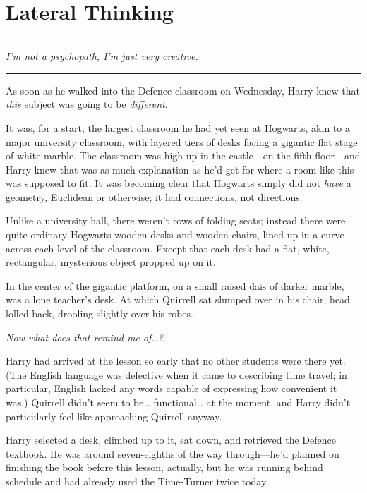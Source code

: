 \chapter{Lateral Thinking}

\begin{center}\rule{3in}{0.4pt}\end{center}

\emph{I'm not a psychopath, I'm just very creative.}

\begin{center}\rule{3in}{0.4pt}\end{center}

As soon as he walked into the Defence classroom on Wednesday, Harry knew
that \emph{this} subject was going to be \emph{different}.

It was, for a start, the largest classroom he had yet seen at Hogwarts,
akin to a major university classroom, with layered tiers of desks facing
a gigantic flat stage of white marble. The classroom was high up in the
castle---on the fifth floor---and Harry knew that was as much
explanation as he'd get for where a room like this was supposed to fit.
It was becoming clear that Hogwarts simply did not \emph{have} a
geometry, Euclidean or otherwise; it had connections, not directions.

Unlike a university hall, there weren't rows of folding seats; instead
there were quite ordinary Hogwarts wooden desks and wooden chairs, lined
up in a curve across each level of the classroom. Except that each desk
had a flat, white, rectangular, mysterious object propped up on it.

In the center of the gigantic platform, on a small raised dais of darker
marble, was a lone teacher's desk. At which Quirrell sat slumped over in
his chair, head lolled back, drooling slightly over his robes.

\emph{Now what does that remind me of\ldots{}?}

Harry had arrived at the lesson so early that no other students were
there yet. (The English language was defective when it came to
describing time travel; in particular, English lacked any words capable
of expressing how convenient it was.) Quirrell didn't seem to be\ldots{}
functional\ldots{} at the moment, and Harry didn't particularly feel
like approaching Quirrell anyway.

Harry selected a desk, climbed up to it, sat down, and retrieved the
Defence textbook. He was around seven-eighths of the way through---he'd
planned on finishing the book before this lesson, actually, but he was
running behind schedule and had already used the Time-Turner twice
today.

